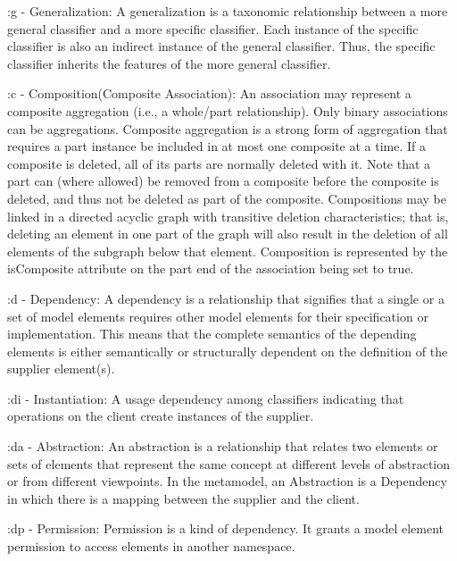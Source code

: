 \documentclass[10pt,a4paper,english]{article}
\begin{document}
\begin{flushleft}
:g - Generalization: A generalization is a taxonomic relationship between a more general classifier and a more specific classifier. Each instance of the specific classifier is also an indirect instance of the general classifier. Thus, the specific classifier inherits the features of the more general classifier.
~\\ \medskip

:c - Composition(Composite Association): An association may represent a composite aggregation (i.e., a whole/part relationship). Only binary associations can be aggregations. Composite aggregation is a strong form of aggregation that requires a part instance be included in at most one composite at a time. If a composite is deleted, all of its parts are normally deleted with it. Note that a part can (where allowed) be removed from a composite before the composite is deleted, and thus not be deleted as part of the composite. Compositions may be linked in a directed acyclic graph with transitive deletion characteristics; that is, deleting an element in one part of the graph will also result in the deletion of all elements of the subgraph below that element. Composition is represented by the isComposite attribute on the part end of the association being set to true.
~\\ \medskip

:d - Dependency: A dependency is a relationship that signifies that a single or a set of model elements requires other model elements for their specification or implementation. This means that the complete semantics of the depending elements is either semantically or structurally dependent on the definition of the supplier element(s).
~\\ \medskip

:di - Instantiation: A usage dependency among classifiers indicating that operations on the client create instances of the supplier.
~\\ \medskip

:da - Abstraction: An abstraction is a relationship that relates two elements or sets of elements that represent the same concept at different levels of abstraction or from different viewpoints. In the metamodel, an Abstraction is a Dependency in which there is a mapping between the supplier and the client.
~\\ \medskip

:dp - Permission: Permission is a kind of dependency. It grants a model element permission to access elements in another namespace.
~\\ \medskip


\end{flushleft}
\end{document}

